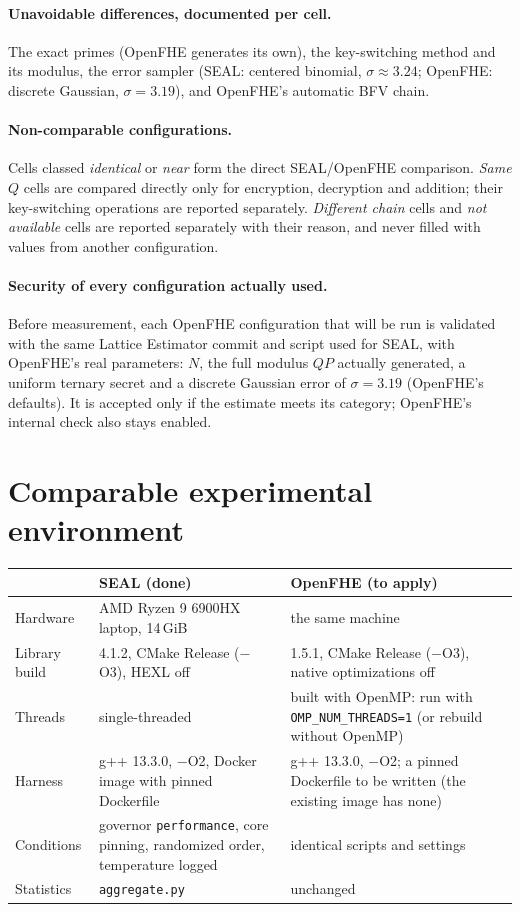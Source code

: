 \documentclass[11pt]{article}
\begin{document}
\paragraph{Unavoidable differences, documented per cell.} The exact primes (OpenFHE generates its own), the key-switching method and its modulus, the error sampler (SEAL: centered binomial, $\sigma \approx 3.24$; OpenFHE: discrete Gaussian, $\sigma = 3.19$), and OpenFHE's automatic BFV chain.

\paragraph{Non-comparable configurations.} Cells classed \emph{identical} or \emph{near} form the direct SEAL/OpenFHE comparison. \emph{Same $Q$} cells are compared directly only for encryption, decryption and addition; their key-switching operations are reported separately. \emph{Different chain} cells and \emph{not available} cells are reported separately with their reason, and never filled with values from another configuration.

\paragraph{Security of every configuration actually used.} Before measurement, each OpenFHE configuration that will be run is validated with the same Lattice Estimator commit and script used for SEAL, with OpenFHE's real parameters: $N$, the full modulus $QP$ actually generated, a uniform ternary secret and a discrete Gaussian error of $\sigma = 3.19$ (OpenFHE's defaults). It is accepted only if the estimate meets its category; OpenFHE's internal check also stays enabled.

\section{Comparable experimental environment}

\begin{center}\footnotesize
\begin{tabular}{@{}L{3.6cm}L{5.4cm}L{5.4cm}@{}}
\toprule
& \textbf{SEAL (done)} & \textbf{OpenFHE (to apply)} \\
\midrule
Hardware & AMD Ryzen 9 6900HX laptop, 14\,GiB & the same machine \\
Library build & 4.1.2, CMake Release ($-$O3), HEXL off & 1.5.1, CMake Release ($-$O3), native optimizations off \\
Threads & single-threaded & built with OpenMP: run with \texttt{OMP\_NUM\_THREADS=1} (or rebuild without OpenMP) \\
Harness & g++ 13.3.0, $-$O2, Docker image with pinned Dockerfile & g++ 13.3.0, $-$O2; a pinned Dockerfile to be written (the existing image has none) \\
Conditions & governor \texttt{performance}, core pinning, randomized order, temperature logged & identical scripts and settings \\
Statistics & \texttt{aggregate.py} & unchanged \\
\bottomrule
\end{tabular}
\end{center}
\end{document}
